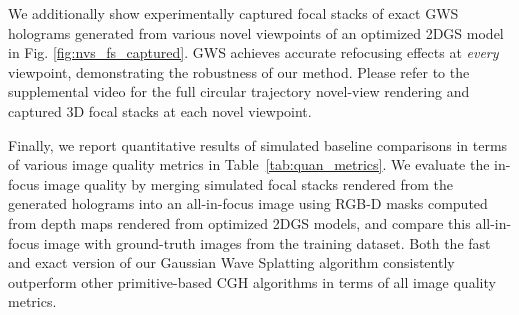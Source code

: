 We additionally show experimentally captured focal stacks of exact GWS holograms generated from various novel viewpoints of an optimized 2DGS model in Fig. \ref{fig:nvs_fs_captured}. GWS achieves accurate refocusing effects at \textit{every} viewpoint, demonstrating the robustness of our method. Please refer to the supplemental video for the full circular trajectory novel-view rendering and captured 3D focal stacks at each novel viewpoint. 



Finally, we report quantitative results of simulated baseline comparisons in terms of various image quality metrics in Table~\ref{tab:quan_metrics}. We evaluate the in-focus image quality by merging simulated focal stacks rendered from the generated holograms into an all-in-focus image using RGB-D masks computed from depth maps rendered from optimized 2DGS models, and compare this all-in-focus image with ground-truth images from the training dataset. Both the fast and exact version of our Gaussian Wave Splatting algorithm consistently outperform other primitive-based CGH algorithms in terms of all image quality metrics. 






